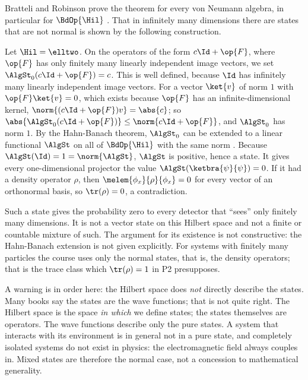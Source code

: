 \begin{vertiefung}
  Bratteli and Robinson prove the theorem for every von Neumann algebra, in particular for
  $\BdOp{\Hil}$ . That in infinitely many dimensions there are
  states that are not normal is shown by the following construction.

  \begin{example}\label{c04.ex.singulaer}
    Let $\Hil = \elltwo$. On the operators of the form $c\Id + \op{F}$, where $\op{F}$ has only
    finitely many linearly independent image vectors, we set $\AlgSt_0(c\Id + \op{F}) = c$. This is
    well defined, because $\Id$ has infinitely many linearly independent image vectors. For a
    vector $\ket{v}$ of norm $1$ with $\op{F}\ket{v} = 0$, which exists because $\op{F}$ has an
    infinite-dimensional kernel, $\norm{(c\Id + \op{F})v} = \abs{c}$; so
    $\abs{\AlgSt_0(c\Id + \op{F})} \leq \norm{c\Id + \op{F}}$, and $\AlgSt_0$ has norm $1$. By the
    Hahn-Banach theorem, $\AlgSt_0$ can be extended to a linear functional $\AlgSt$ on all of
    $\BdOp{\Hil}$ with the same norm . Because
    $\AlgSt(\Id) = 1 = \norm{\AlgSt}$, $\AlgSt$ is positive, hence a state. It gives every
    one-dimensional projector the value $\AlgSt(\ketbra{\psi}{\psi}) = 0$. If it had a density
    operator $\rho$, then $\melem{\phi_x}{\rho}{\phi_x} = 0$ for every vector of an orthonormal
    basis, so $\tr(\rho) = 0$, a contradiction.
  \end{example}

  Such a state gives the probability zero to every detector that ``sees'' only finitely many
  dimensions. It is not a vector state on this Hilbert space and not a finite or countable mixture
  of such. The argument for its existence is not constructive: the Hahn-Banach extension is not
  given explicitly. For systems with finitely many particles the course uses only the normal
  states, that is, the density operators; that is the trace class which $\tr(\rho) = 1$ in P2
  presupposes.
\end{vertiefung}

A warning is in order here: the Hilbert space does \emph{not} directly describe the states. Many
books say the states are the wave functions; that is not quite right. The Hilbert space is the
space \emph{in which} we define states; the states themselves are operators. The wave functions
describe only the pure states. A system that interacts with its environment is in general not in
a pure state, and completely isolated systems do not exist in physics: the electromagnetic field
always couples in. Mixed states are therefore the normal case, not a concession to mathematical
generality.


